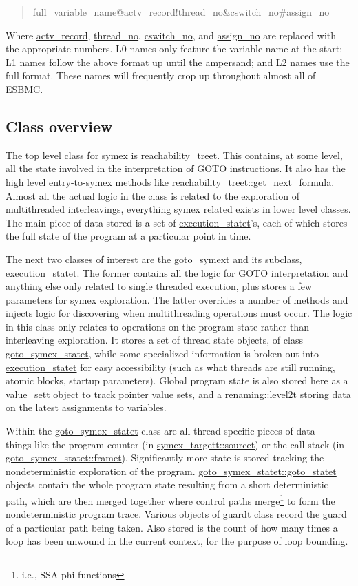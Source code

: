 \documentclass{article}
\begin{document}
\begin{quote}
full\_variable\_name@actv\_record!thread\_no\&cswitch\_no\#assign\_no
\end{quote}

Where \url{actv_record}, \url{thread_no}, \url{cswitch_no}, and
\url{assign_no} are replaced with the appropriate numbers. L0 names only
feature the variable name at the start; L1 names follow the above format
up until the ampersand; and L2 names use the full format. These names will
frequently crop up throughout almost all of ESBMC.

\subsection{Class overview}

The top level class for symex is \url{reachability_treet}. This contains,
at some level, all the state involved in the interpretation of GOTO
instructions. It also has the high level entry-to-symex methods like
\url{reachability_treet::get_next_formula}. Almost all the actual
logic in the class is related to the exploration of multithreaded interleavings,
everything symex related exists in lower level classes. The main piece of
data stored is a set of \url{execution_statet}'s, each of which stores
the full state of the program at a particular point in time.

The next two classes of interest are the \url{goto_symext} and its
subclass, \url{execution_statet}. The former contains all the logic
for GOTO interpretation and anything else only related to single threaded
execution, plus stores a few parameters for symex exploration. The latter
overrides a number of methods and injects logic for discovering when
multithreading operations must occur. The logic in this class only relates
to operations on the program state rather than interleaving exploration.
It stores a set of thread state objects, of class
\url{goto_symex_statet}, while some specialized information is broken out
into \url{execution_statet} for easy accessibility (such as what threads
are still running, atomic blocks, startup parameters). Global program state
is also stored here as a \url{value_sett} object to track pointer value
sets, and a \url{renaming::level2t} storing data on the latest assignments
to variables.

Within the \url{goto_symex_statet} class are all thread specific pieces
of data --- things like the program counter (in
\url{symex_targett::sourcet}) or the call stack (in
\url{goto_symex_statet::framet}). Significantly more state is stored
tracking the nondeterministic exploration of the program.
\url{goto_symex_statet::goto_statet} objects contain the whole program
state resulting from a short deterministic path, which are then merged together
where control paths merge\footnote{i.e., SSA phi functions} to form the
nondeterministic program trace. Various objects of \url{guardt} class
record the guard of a particular path being taken. Also stored is the count
of how many times a loop has been unwound in the current context, for the
purpose of loop bounding.
\end{document}
